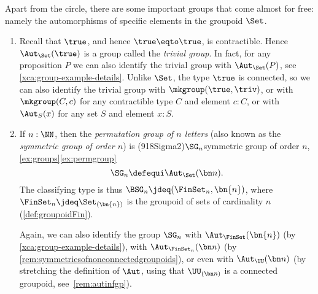 \begin{example}\label{ex:groups}
  Apart from the circle, there are some important groups that come 
  almost for free: namely the automorphisms of specific elements
  in the groupoid $\Set$.
  \begin{enumerate}
  \item\label{ex:trivgroup}
  Recall that $\true$, and hence $\true \eqto \true$, is contractible.
  Hence $\Aut_{\Set}(\true)$ is a group called the 
  \emph{trivial group}. 
  In fact, for any proposition $P$ we can also identify the trivial group 
  with $\Aut_{\Set}(P)$, see \cref{xca:group-example-details}. 
  Unlike $\Set$, the type $\true$ is connected,
  so we can also identify the trivial group with
  $\mkgroup (\true,\triv)$, or with $\mkgroup (C,c)$ for
  any contractible type $C$ and element $c:C$, or
  with $\Aut_{S}(x)$ for any set $S$ and element $x:S$.
 
  \item\label{ex:permgroup}
    If $n:\NN$, then the \emph{permutation group of $n$ letters}
    (also known as the \emph{symmetric group of order $n$}) is%
    \glossary(918Sigma2){$\protect\SG_n$}{symmetric group of order $n$,
      \cref{ex:groups}\ref{ex:permgroup}}%
    \[
      \SG_n\defequi \Aut_{\Set}(\bn n). %
    \]
    The classifying type is thus $\BSG_n\jdeq (\FinSet_n,\bn{n})$,   
    where $\FinSet_n \jdeq \Set_{(\bn{n})}$ is the groupoid of 
    sets of cardinality $n$ (\cf \ref{def:groupoidFin}).
    
    Again, we can also identify the group $\SG_n$ with
    $\Aut_\FinSet(\bn{n})$ (by \cref{xca:group-example-details}), with 
    $\Aut_{\FinSet_n}(\bn n)$ (by \cref{rem:symmetriesofnonconnectedgroupoids}),
    or even with $\Aut_{\UU}(\bn n)$ (by stretching the definition of $\Aut$,
    using that $\UU_{(\bn n)}$ is a connected groupoid, see~\cref{rem:autinfgp}).



\end{enumerate}
\end{example}
